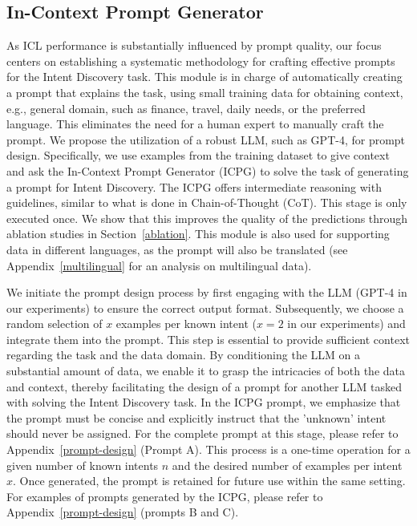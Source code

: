 \documentclass[11pt]{article}
\begin{document}
\subsection{In-Context Prompt Generator}
As ICL performance is substantially influenced by prompt quality, our focus centers on establishing a systematic methodology for crafting effective prompts for the Intent Discovery task. This module is in charge of automatically creating a prompt that explains the task, using small training data for obtaining context, e.g., general domain, such as finance, travel, daily needs, or the preferred language. This eliminates the need for a human expert to manually craft the prompt. We propose the utilization of a robust LLM, such as GPT-4, for prompt design. Specifically, we use examples from the training dataset to give context and ask the In-Context Prompt Generator (ICPG) to solve the task of generating a prompt for Intent Discovery. The ICPG offers intermediate reasoning with guidelines, similar to what is done in Chain-of-Thought (CoT)\cite{chu2023survey}. This stage is only executed once. We show that this improves the quality of the predictions through ablation studies in Section~\ref{ablation}. This module is also used for supporting data in different languages, as the prompt will also be translated (see Appendix~\ref{multilingual} for an analysis on multilingual data).

We initiate the prompt design process by first engaging with the LLM (GPT-4 in our experiments) to ensure the correct output format. Subsequently, we choose a random selection of $x$ examples per known intent ($x=2$ in our experiments) and integrate them into the prompt. This step is essential to provide sufficient context regarding the task and the data domain. By conditioning the LLM on a substantial amount of data, we enable it to grasp the intricacies of both the data and context, thereby facilitating the design of a prompt for another LLM tasked with solving the Intent Discovery task. In the ICPG prompt, we emphasize that the prompt must be concise and explicitly instruct that the 'unknown' intent should never be assigned. For the complete prompt at this stage, please refer to Appendix~\ref{prompt-design} (Prompt A). This process is a one-time operation for a given number of known intents $n$ and the desired number of examples per intent $x$. Once generated, the prompt is retained for future use within the same setting. For examples of prompts generated by the ICPG, please refer to Appendix~\ref{prompt-design} (prompts B and C).
\end{document}
